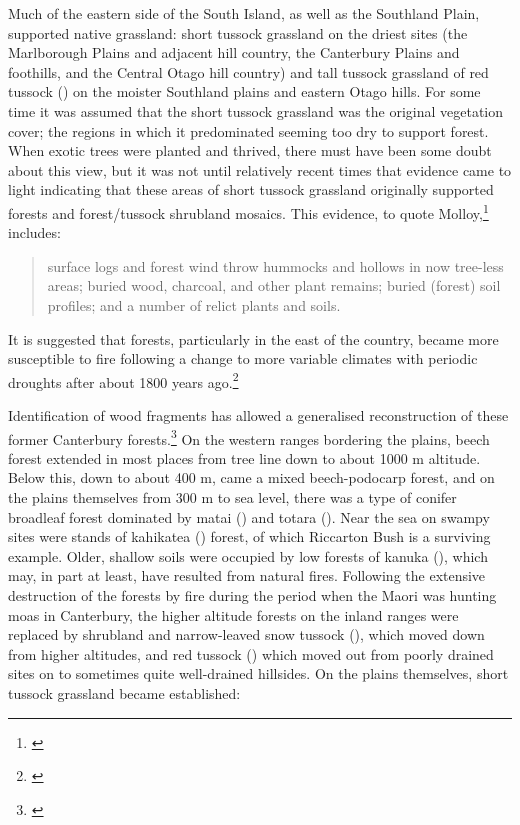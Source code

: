 Much of the eastern side of the South Island, as well as the Southland Plain, supported native grassland: short tussock grassland on the driest sites (the Marlborough Plains and adjacent hill country, the Canterbury Plains and foothills, and the Central Otago hill country) and tall tussock grassland of red tussock () on the moister Southland plains and eastern Otago hills.
For some time it was assumed that the short tussock grassland was the original vegetation cover; the regions in which it predominated seeming too dry to support forest.
When exotic trees were planted and thrived, there must have been some doubt about this view, but it was not until relatively recent times that evidence came to light indicating that these areas of short tussock grassland originally supported forests and forest/tussock shrubland mosaics.
This evidence, to quote Molloy,\footnote{\cite{molloybpj1963distribution}} includes:

\begin{quote}
	surface logs and forest wind throw hummocks and hollows in now tree-less areas; buried wood, charcoal, and other plant remains; buried (forest) soil profiles; and a number of relict plants and soils.
\end{quote}

It is suggested that forests, particularly in the east of the country, became more susceptible to fire following a change to more variable climates with periodic droughts after about 1800 years ago.\footnote{\cite{mcglone1977ascarina}}

Identification of wood fragments has allowed a generalised reconstruction of these former Canterbury forests.\footnote{\cite{molloy1969recent}}
On the western ranges bordering the plains, beech forest extended in most places from tree line down to about 1000 m altitude.
Below this, down to about 400 m, came a mixed beech-podocarp forest, and on the plains themselves from 300 m to sea level, there was a type of conifer broadleaf forest dominated by matai () and totara ().
Near the sea on swampy sites were stands of kahikatea () forest, of which Riccarton Bush is a surviving example.
Older, shallow soils were occupied by low forests of kanuka (), which may, in part at least, have resulted from natural fires.
Following the extensive destruction of the forests by fire during the period when the Maori was hunting moas in Canterbury, the higher altitude forests on the inland ranges were replaced by shrubland and narrow-leaved snow tussock (), which moved down from higher altitudes, and red tussock () which moved out from poorly drained sites on to sometimes quite well-drained hillsides.
On the plains themselves, short tussock grassland became established:

